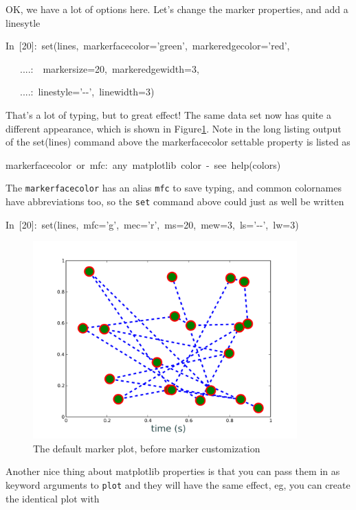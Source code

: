 OK, we have a lot of options here.  Let's change the marker properties,
and add a linesytle

\begin{lyxcode}
In~{[}20]:~set(lines,~markerfacecolor='green',~markeredgecolor='red',

~~~....:~~markersize=20,~markeredgewidth=3,~

~~~....:~linestyle='-{}-',~linewidth=3)


\end{lyxcode}
That's a lot of typing, but to great effect!  The same data set now
has quite a different appearance, which is shown in Figure\ref{fig:mpl_setget2}.
Note in the long listing output of the set(lines) command above the
markerfacecolor settable property is listed as

\begin{lyxcode}
markerfacecolor~or~mfc:~any~matplotlib~color~-~see~help(colors)
\end{lyxcode}
The \texttt{markerfacecolor} has an alias \texttt{mfc} to save typing,
and common colornames have abbreviations too, so the \texttt{set}
command above could just as well be written

\begin{lyxcode}
In~{[}20]:~set(lines,~mfc='g',~mec='r',~ms=20,~mew=3,~ls='-{}-',~lw=3)

%
\begin{figure}
\begin{centering}
\includegraphics[width=4in]{fig/mpl_set_get2}
\par\end{centering}

\caption{\label{fig:mpl_setget2}The default marker plot, before marker customization}

\end{figure}

\end{lyxcode}
Another nice thing about matplotlib properties is that you can pass
them in as keyword arguments to \texttt{plot} and they will have the
same effect, eg, you can create the identical plot with

